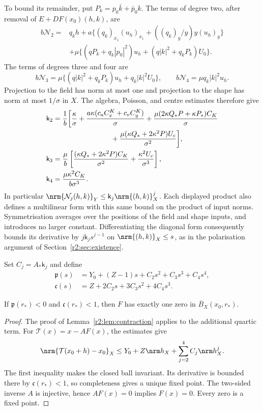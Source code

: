 To bound its remainder, put $P_k=p_0\bar k+\bar p_0k$.
The terms of degree two, after removal of $E+DF(x_0)(h,k)$,
are
\[
 \begin{split}
 b\mathcal N_2={}&q_kh+
 a\{(q_k)_{x_1}(u_h)_{x_1}+((q_k)_y/y)y(u_h)_y\}\\
 &+\mu\{(qP_k+q_k|p_0|^2)u_h+(q|k|^2+q_kP_k)U_0\}.
 \end{split}
\]
The terms of degrees three and four are
\[
 b\mathcal N_3=\mu\{(q|k|^2+q_kP_k)u_h+q_k|k|^2U_0\},
 \qquad b\mathcal N_4=\mu q_k|k|^2u_h .
\]
Projection to the field has norm at most one and projection to the
shape has norm at most $1/\sigma$ in $X$.
The algebra, Poisson, and centre estimates therefore give
\begin{equation}\label{gd:eq:c234}
 \begin{split}
 \mathsf k_2={}&\frac1b\biggl[
 \frac{\kappa}{\sigma}
 +\frac{a\kappa(c_aC_x^K+c_vC_y^K)}{\sigma}
 +\frac{\mu(2\kappa Q_*P+\kappa P_*)C_K}{\sigma}\\
 &\hspace{24mm}
       +\frac{\mu(\kappa Q_*+2\kappa^2P)U_c}{\sigma^2}\biggr],\\
 \mathsf k_3={}&\frac\mu b\left[
       \frac{(\kappa Q_*+2\kappa^2P)C_K}{\sigma^2}
       +\frac{\kappa^2U_c}{\sigma^3}\right],\\
 \mathsf k_4={}&\frac{\mu\kappa^2C_K}{b\sigma^3}.
 \end{split}
\end{equation}
In particular $\nrm{\mathcal N_j(h,k)}_Y\le
\mathsf k_j\nrm{(h,k)}_X^j$.
Each displayed product also defines a multilinear form with this same
bound on the product of input norms. Symmetrisation averages over the
positions of the field and shape inputs, and introduces no larger
constant. Differentiating the diagonal form consequently bounds
its derivative by $j\mathsf k_js^{j-1}$ on $\nrm{(h,k)}_X\le s$,
as in the polarisation argument of Section~\ref{r2:sec:existence}.

Set $C_j=A_*\mathsf k_j$ and define
\begin{equation}\label{gd:eq:radii}
 \begin{split}
 \mathfrak p(s)&=Y_0+(Z-1)s+C_2s^2+C_3s^3+C_4s^4,\\
 \mathfrak c(s)&=Z+2C_2s+3C_3s^2+4C_4s^3 .
 \end{split}
\end{equation}

\begin{proposition}\label{gd:prop:zero}
If $\mathfrak p(r_*)<0$ and $\mathfrak c(r_*)<1$, then
$F$ has exactly one zero in
$\overline B_X(x_0,r_*)$.
\end{proposition}
\begin{proof}
The proof of Lemma~\ref{r2:lem:contraction} applies to the additional
quartic term. For $\mathcal T(x)=x-AF(x)$, the estimates give
\[
 \nrm{\mathcal T(x_0+h)-x_0}_X
 \le Y_0+Z\nrm h_X+\sum_{j=2}^4C_j\nrm h_X^j .
\]
The first inequality makes the closed ball invariant.
Its derivative is bounded there by $\mathfrak c(r_*)<1$,
so completeness gives a unique fixed point.
The two-sided inverse $A$ is injective, hence $AF(x)=0$ implies
$F(x)=0$. Every zero is a fixed point.
\end{proof}

